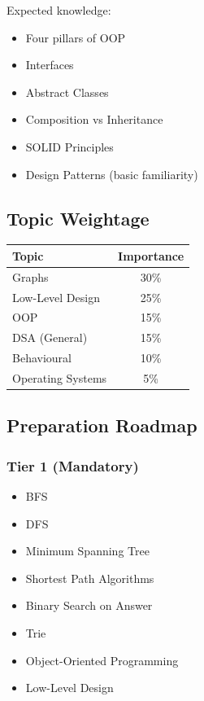 \documentclass[11pt,a4paper]{article}
\begin{document}
Expected knowledge:

\begin{itemize}
	\item Four pillars of OOP
	\item Interfaces
	\item Abstract Classes
	\item Composition vs Inheritance
	\item SOLID Principles
	\item Design Patterns (basic familiarity)
\end{itemize}


\subsection{Topic Weightage}

\begin{center}
	\begin{tabular}{|l|c|}
		\hline
		Topic & Importance \\
		\hline
		Graphs & 30\% \\
		Low-Level Design & 25\% \\
		OOP & 15\% \\
		DSA (General) & 15\% \\
		Behavioural & 10\% \\
		Operating Systems & 5\% \\
		\hline
	\end{tabular}
\end{center}


\subsection{Preparation Roadmap}

\subsubsection{Tier 1 (Mandatory)}

\begin{itemize}
	\item BFS
	\item DFS
	\item Minimum Spanning Tree
	\item Shortest Path Algorithms
	\item Binary Search on Answer
	\item Trie
	\item Object-Oriented Programming
	\item Low-Level Design
\end{itemize}
\end{document}
